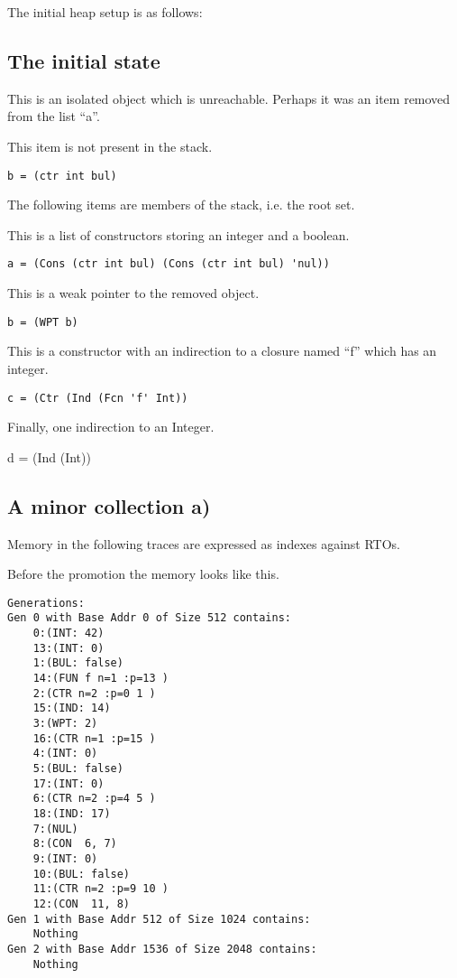 \documentclass{article}
\begin{document}
The initial heap setup is as follows:

\subsection{The initial state}

This is an isolated object which is unreachable. Perhaps it was an item removed from the list ``a''.

This item is not present in the stack.

\begin{verbatim}
b = (ctr int bul)
\end{verbatim}

The following items are members of the stack, i.e. the root set. 

This is a list of constructors storing an integer and a boolean.

\begin{verbatim}
a = (Cons (ctr int bul) (Cons (ctr int bul) 'nul))
\end{verbatim}

This is a weak pointer to the removed object. 

\begin{verbatim}
b = (WPT b)
\end{verbatim}

This is a constructor with an indirection to a closure named ``f'' which has an integer.

\begin{verbatim}
c = (Ctr (Ind (Fcn 'f' Int))
\end{verbatim}

Finally, one indirection to an Integer. 

d = (Ind (Int))

\subsection{A minor collection a)}

Memory in the following traces are expressed as indexes against RTOs.

Before the promotion the memory looks like this.

\begin{verbatim}
Generations: 
Gen 0 with Base Addr 0 of Size 512 contains:
    0:(INT: 42)
    13:(INT: 0)
    1:(BUL: false)
    14:(FUN f n=1 :p=13 )
    2:(CTR n=2 :p=0 1 )
    15:(IND: 14)
    3:(WPT: 2)
    16:(CTR n=1 :p=15 )
    4:(INT: 0)
    5:(BUL: false)
    17:(INT: 0)
    6:(CTR n=2 :p=4 5 )
    18:(IND: 17)
    7:(NUL)
    8:(CON  6, 7)
    9:(INT: 0)
    10:(BUL: false)
    11:(CTR n=2 :p=9 10 )
    12:(CON  11, 8)
Gen 1 with Base Addr 512 of Size 1024 contains:
    Nothing
Gen 2 with Base Addr 1536 of Size 2048 contains:
    Nothing

\end{verbatim}
\end{document}
